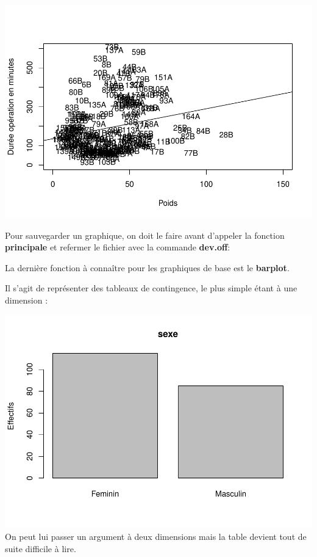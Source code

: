 \documentclass[
]{book}
\newenvironment{Shaded}{\begin{snugshade}}{\end{snugshade}}
\newcommand{\AttributeTok}[1]{\textcolor[rgb]{0.13,0.29,0.53}{#1}}
\newcommand{\FunctionTok}[1]{\textcolor[rgb]{0.13,0.29,0.53}{\textbf{#1}}}
\newcommand{\NormalTok}[1]{#1}
\newcommand{\OtherTok}[1]{\textcolor[rgb]{0.56,0.35,0.01}{#1}}
\newcommand{\SpecialCharTok}[1]{\textcolor[rgb]{0.81,0.36,0.00}{\textbf{#1}}}
\newcommand{\StringTok}[1]{\textcolor[rgb]{0.31,0.60,0.02}{#1}}
\begin{document}
\includegraphics{_main_files/figure-latex/poids11-1.pdf}

Pour sauvegarder un graphique, on doit le faire avant d'appeler la fonction
\textbf{principale} et refermer le fichier avec la commande \textbf{dev.off}:

La dernière fonction à connaître pour les graphiques de base est le \textbf{barplot}.

Il s'agit de représenter des tableaux de contingence, le plus simple étant à une
dimension :

\begin{Shaded}
\end{Shaded}

\includegraphics{_main_files/figure-latex/sexe1-1.pdf}
On peut lui passer un argument à deux dimensions mais la table devient tout de
suite difficile à lire.
\end{document}
